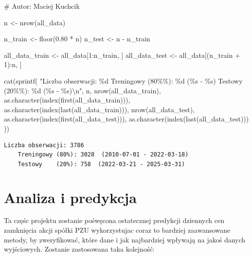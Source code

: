 \documentclass[
  polish,
  letterpaper,
  DIV=11,
  numbers=noendperiod]{scrartcl}
\newenvironment{Shaded}{\begin{snugshade}}{\end{snugshade}}
\newcommand{\CommentTok}[1]{\textcolor[rgb]{0.37,0.37,0.37}{#1}}
\newcommand{\DecValTok}[1]{\textcolor[rgb]{0.68,0.00,0.00}{#1}}
\newcommand{\FloatTok}[1]{\textcolor[rgb]{0.68,0.00,0.00}{#1}}
\newcommand{\FunctionTok}[1]{\textcolor[rgb]{0.28,0.35,0.67}{#1}}
\newcommand{\NormalTok}[1]{\textcolor[rgb]{0.00,0.23,0.31}{#1}}
\newcommand{\OtherTok}[1]{\textcolor[rgb]{0.00,0.23,0.31}{#1}}
\newcommand{\SpecialCharTok}[1]{\textcolor[rgb]{0.37,0.37,0.37}{#1}}
\newcommand{\StringTok}[1]{\textcolor[rgb]{0.13,0.47,0.30}{#1}}
\begin{document}
\begin{Shaded}
\begin{Highlighting}[]
\CommentTok{\# Autor: Maciej Kuchcik}

\NormalTok{n }\OtherTok{\textless{}{-}} \FunctionTok{nrow}\NormalTok{(all\_data)}

\NormalTok{n\_train }\OtherTok{\textless{}{-}} \FunctionTok{floor}\NormalTok{(}\FloatTok{0.80} \SpecialCharTok{*}\NormalTok{ n)}
\NormalTok{n\_test  }\OtherTok{\textless{}{-}}\NormalTok{ n }\SpecialCharTok{{-}}\NormalTok{ n\_train}

\NormalTok{all\_data\_train }\OtherTok{\textless{}{-}}\NormalTok{ all\_data[}\DecValTok{1}\SpecialCharTok{:}\NormalTok{n\_train, ]}
\NormalTok{all\_data\_test  }\OtherTok{\textless{}{-}}\NormalTok{ all\_data[(n\_train }\SpecialCharTok{+} \DecValTok{1}\NormalTok{)}\SpecialCharTok{:}\NormalTok{n, ]}

\FunctionTok{cat}\NormalTok{(}\FunctionTok{sprintf}\NormalTok{(}
  \StringTok{"Liczba obserwacji: \%d}
\StringTok{    Treningowy (80\%\%): \%d  (\%s {-} \%s)}
\StringTok{    Testowy    (20\%\%): \%d  (\%s {-} \%s)}\SpecialCharTok{\textbackslash{}n}\StringTok{"}\NormalTok{,}
\NormalTok{  n,}
  \FunctionTok{nrow}\NormalTok{(all\_data\_train), }\FunctionTok{as.character}\NormalTok{(}\FunctionTok{index}\NormalTok{(}\FunctionTok{first}\NormalTok{(all\_data\_train))),}
    \FunctionTok{as.character}\NormalTok{(}\FunctionTok{index}\NormalTok{(}\FunctionTok{last}\NormalTok{(all\_data\_train))),}
  \FunctionTok{nrow}\NormalTok{(all\_data\_test),  }\FunctionTok{as.character}\NormalTok{(}\FunctionTok{index}\NormalTok{(}\FunctionTok{first}\NormalTok{(all\_data\_test))),}
    \FunctionTok{as.character}\NormalTok{(}\FunctionTok{index}\NormalTok{(}\FunctionTok{last}\NormalTok{(all\_data\_test)))}
\NormalTok{))}
\end{Highlighting}
\end{Shaded}

\begin{verbatim}
Liczba obserwacji: 3786
    Treningowy (80%): 3028  (2010-07-01 - 2022-03-18)
    Testowy    (20%): 758  (2022-03-21 - 2025-03-31)
\end{verbatim}

\section{Analiza i predykcja}\label{analiza-i-predykcja}

Ta częśc projektu zostanie pośwęcona ostatecznej predykcji dziennych cen
zamknięcia akcji spółki PZU wykorzystujac coraz to bardziej zaawansowane
metody, by zweryfikować, które dane i jak najbardziej wpływają na jakoś
danych wyjściowych. Zostanie zastosowana taka kolejność:
\end{document}

